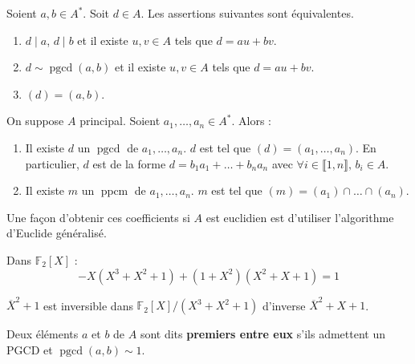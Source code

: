   \begin{proposition}
    Soient $a, b \in A^*$. Soit $d \in A$. Les assertions suivantes sont équivalentes.
    \begin{enumerate}[label=(\roman*)]
      \item $d \mid a$, $d \mid b$ et il existe $u, v \in A$ tels que $d = au + bv$.
      \item $d \sim \operatorname{pgcd}(a, b)$ et il existe $u, v \in A$ tels que $d = au + bv$.
      \item $(d) = (a,b)$.
    \end{enumerate}
  \end{proposition}

  \begin{theorem}
    On suppose $A$ principal. Soient $a_1, \dots, a_n \in A^*$. Alors :
    \begin{enumerate}[label=(\roman*)]
      \item Il existe $d$ un $\operatorname{pgcd}$ de $a_1, \dots, a_n$. $d$ est tel que $(d) = (a_1, \dots, a_n)$. En particulier, $d$ est de la forme $d = b_1 a_1 + \dots + b_n a_n$ avec $\forall i \in \llbracket 1, n \rrbracket, \, b_i \in A$.
      \item Il existe $m$ un $\operatorname{ppcm}$ de $a_1, \dots, a_n$. $m$ est tel que $(m) = (a_1) \cap \dots \cap (a_n)$.
    \end{enumerate}
  \end{theorem}

  \begin{remark}
    Une façon d'obtenir ces coefficients si $A$ est euclidien est d'utiliser l'algorithme d'Euclide généralisé.
  \end{remark}


  \begin{example}
    Dans $\mathbb{F}_2[X]$ :
    \[ -X(X^3+X^2+1) + (1+X^2)(X^2+X+1) = 1 \]
  \end{example}

  \begin{application}
    $\overline{X}^2+1$ est inversible dans $\mathbb{F}_2[X]/(X^3 + X^2 + 1)$ d'inverse $\overline{X}^2+X+1$.
  \end{application}


  \begin{definition}
    Deux éléments $a$ et $b$ de $A$ sont dits \textbf{premiers entre eux} s'ils admettent un PGCD et $\operatorname{pgcd}(a,b) \sim 1$.
  \end{definition}

